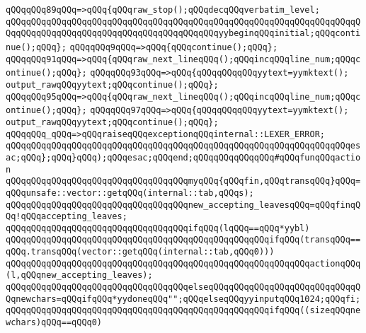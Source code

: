 \verb|qQQqqQQq89qQQq=>qQQq{qQQqraw_stop();qQQqdecqQQqverbatim_level;|\newline
\verb|qQQqqQQqqQQqqQQqqQQqqQQqqQQqqQQqqQQqqQQqqQQqqQQqqQQqqQQqqQQqqQQqqQQqqQQqqQQqqQQqqQQqqQQqqQQqqQQqqQQqqQQqqQQqqQQqyybeginqQQqinitial;qQQqcontinue();qQQq};|\newline
\verb|qQQqqQQq9qQQq=>qQQq{qQQqcontinue();qQQq};|\newline
\verb|qQQqqQQq91qQQq=>qQQq{qQQqraw_next_lineqQQq();qQQqincqQQqline_num;qQQqcontinue();qQQq};|\newline
\verb|qQQqqQQq93qQQq=>qQQq{qQQqqQQqqQQqyytext=yymktext();|\newline
\verb|output_rawqQQqyytext;qQQqcontinue();qQQq};|\newline
\verb|qQQqqQQq95qQQq=>qQQq{qQQqraw_next_lineqQQq();qQQqincqQQqline_num;qQQqcontinue();qQQq};|\newline
\verb|qQQqqQQq97qQQq=>qQQq{qQQqqQQqqQQqyytext=yymktext();|\newline
\verb|output_rawqQQqyytext;qQQqcontinue();qQQq};|\newline
\verb|qQQqqQQq_qQQq=>qQQqraiseqQQqexceptionqQQqinternal::LEXER_ERROR;|\newline
\newline
\verb|qQQqqQQqqQQqqQQqqQQqqQQqqQQqqQQqqQQqqQQqqQQqqQQqqQQqqQQqqQQqqQQqqQQqesac;qQQq};qQQq}qQQq);qQQqesac;qQQqend;qQQqqQQqqQQqqQQq#qQQqfunqQQqaction|\newline
\newline
\verb|qQQqqQQqqQQqqQQqqQQqqQQqqQQqqQQqqQQqmyqQQq{qQQqfin,qQQqtransqQQq}qQQq=qQQqunsafe::vector::getqQQq(internal::tab,qQQqs);|\newline
\verb|qQQqqQQqqQQqqQQqqQQqqQQqqQQqqQQqqQQqnew_accepting_leavesqQQq=qQQqfinqQQq!qQQqaccepting_leaves;|\newline
\verb|qQQqqQQqqQQqqQQqqQQqqQQqqQQqqQQqqQQqifqQQq(lqQQq==qQQq*yybl)|\newline
\verb|qQQqqQQqqQQqqQQqqQQqqQQqqQQqqQQqqQQqqQQqqQQqqQQqqQQqifqQQq(transqQQq==qQQq.transqQQq(vector::getqQQq(internal::tab,qQQq0)))|\newline
\verb|qQQqqQQqqQQqqQQqqQQqqQQqqQQqqQQqqQQqqQQqqQQqqQQqqQQqqQQqqQQqactionqQQq(l,qQQqnew_accepting_leaves);|\newline
\verb|qQQqqQQqqQQqqQQqqQQqqQQqqQQqqQQqqQQqelseqQQqqQQqqQQqqQQqqQQqqQQqqQQqqQQqnewchars=qQQqifqQQq*yydoneqQQq"";qQQqelseqQQqyyinputqQQq1024;qQQqfi;|\newline
\verb|qQQqqQQqqQQqqQQqqQQqqQQqqQQqqQQqqQQqqQQqqQQqqQQqqQQqifqQQq((sizeqQQqnewchars)qQQq==qQQq0)|\newline
